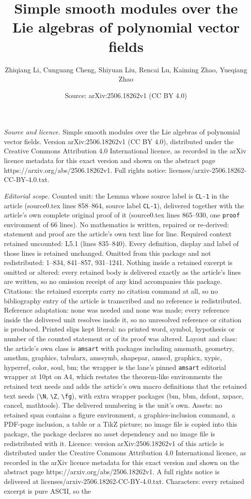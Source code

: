 \documentclass[10pt,a4paper]{amsart}
\title[Simple smooth modules over the Lie algebras of polynomial ve]{Simple smooth modules over the Lie algebras of polynomial vector fields}
\author{Zhiqiang Li, Cunguang Cheng, Shiyuan Liu, Rencai Lu, Kaiming Zhao, Yueqiang Zhao}
\date{Source: arXiv:2506.18262v1 (CC BY 4.0)}
\begin{document}
\maketitle

\noindent\emph{Source and licence.} Simple smooth modules over the Lie algebras of polynomial vector fields. Version arXiv:2506.18262v1 (CC BY 4.0), distributed under the Creative Commons Attribution 4.0 International licence, as recorded in the arXiv licence metadata for this exact version and shown on the abstract page https://arxiv.org/abs/2506.18262v1. Full rights notice: licenses/arxiv-2506.18262-CC-BY-4.0.txt.\par\smallskip

\noindent\textit{Editorial scope.} Counted unit: the Lemma whose source label is \texttt{CL-1} in the article (source0.tex lines 858--864, source label \texttt{CL-1}), delivered together with the article's own complete original proof of it (source0.tex lines 865--930, one \texttt{proof} environment of 66 lines). No mathematics is written, repaired or re-derived: statement and proof are the article's own text line for line. Required context retained uncounted: L5.1 (lines 835--840). Every definition, display and label of those lines is retained unchanged. Omitted from this package and not redistributed: 1--834, 841--857, 931--1241. Nothing inside a retained excerpt is omitted or altered: every retained body is delivered exactly as the article's lines are written, so no omission receipt of any kind accompanies this package. Citations: the retained excerpts carry no citation command at all, so no bibliography entry of the article is transcribed and no reference is redistributed. Reference adaptation: none was needed and none was made; every reference inside the delivered unit resolves inside it, so no unresolved reference or citation is produced. Printed slips kept literal: no printed word, symbol, hypothesis or number of the counted statement or of its proof was altered. Layout and class: the article's own class is \texttt{amsart} with packages including amsmath, geometry, amsthm, graphics, tabularx, amssymb, shapepar, amscd, graphicx, xypic, hyperref, color, soul, bm; the wrapper is the lane's pinned \texttt{amsart} editorial wrapper at 10pt on A4, which restates the theorem-like environments the retained text needs and adds the article's own macro definitions that the retained text needs (\texttt{\textbackslash N}, \texttt{\textbackslash Z}, \texttt{\textbackslash fg}), with extra wrapper packages (bm, bbm, dsfont, xspace, cancel, mathtools). The delivered numbering is the unit's own. Assets: no retained span contains a figure environment, a graphics-inclusion command, a PDF-page inclusion, a table or a TikZ picture; no image file is copied into this package, the package declares no asset dependency and no image file is redistributed with it. Licence: version arXiv:2506.18262v1 of this article is distributed under the Creative Commons Attribution 4.0 International licence, as recorded in the arXiv licence metadata for this exact version and shown on the abstract page https://arxiv.org/abs/2506.18262v1. A full rights notice is delivered at licenses/arxiv-2506.18262-CC-BY-4.0.txt. Characters: every retained excerpt is pure ASCII, so the 
\end{document}
